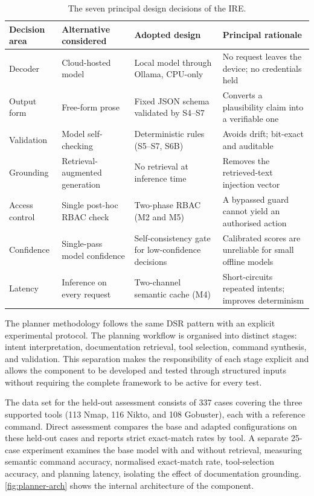 \begin{table}[htbp]
  \centering
  \begin{tabular}{@{}p{}p{}p{}p{}@{}}
    \toprule
    \textbf{Decision area} & \textbf{Alternative considered} & \textbf{Adopted design} & \textbf{Principal rationale}\\
    \midrule
    Decoder & Cloud-hosted model & Local model through Ollama, CPU-only & No request leaves the device; no credentials held\\
    Output form & Free-form prose & Fixed JSON schema validated by S4--S7 & Converts a plausibility claim into a verifiable one\\
    Validation & Model self-checking & Deterministic rules (S5--S7, S6B) & Avoids drift; bit-exact and auditable\\
    Grounding & Retrieval-augmented generation & No retrieval at inference time & Removes the retrieved-text injection vector\\
    Access control & Single post-hoc RBAC check & Two-phase RBAC (M2 and M5) & A bypassed guard cannot yield an authorised action\\
    Confidence & Single-pass model confidence & Self-consistency gate for low-confidence decisions & Calibrated scores are unreliable for small offline models\\
    Latency & Inference on every request & Two-channel semantic cache (M4) & Short-circuits repeated intents; improves determinism\\
    \bottomrule
  \end{tabular}
  \caption{The seven principal design decisions of the IRE.}\label{tab:ire-decisions}
\end{table}

The planner methodology follows the same DSR pattern with an explicit
experimental protocol. The planning workflow is organised into distinct stages:
intent interpretation, documentation retrieval, tool selection, command
synthesis, and validation. This separation makes the responsibility of each
stage explicit and allows the component to be developed and tested through
structured inputs without requiring the complete framework to be active for
every test.

The data set for the held-out assessment consists of 337 cases covering the
three supported tools (113 Nmap, 116 Nikto, and 108 Gobuster), each with a
reference command. Direct assessment compares the base and adapted
configurations on these held-out cases and reports strict exact-match rates by
tool. A separate 25-case experiment examines the base model with and without
retrieval, measuring semantic command accuracy, normalised exact-match rate,
tool-selection accuracy, and planning latency, isolating the effect of
documentation grounding. \cref{fig:planner-arch} shows the internal architecture
of the component.

